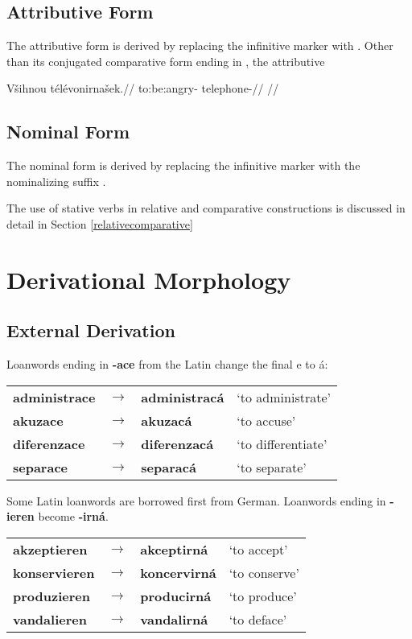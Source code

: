 \subsection{Attributive Form}
The attributive form is derived by replacing the infinitive marker  with . Other than its conjugated comparative form ending in , the attributive

\ex
\begingl
\gla V\v{s}ihnou t\'el\'evonirna\v{s}ek.//
\glb to:be:angry- telephone-//
\glft {}//
\endgl

\xe


\subsection{Nominal Form}
The nominal form is derived by replacing the infinitive marker  with the nominalizing suffix .




The use of stative verbs in relative and comparative constructions is discussed in detail in Section \ref{relativecomparative}
\section{Derivational Morphology}
\subsection{External Derivation}
\par Loanwords ending in \textbf{-ace} from the Latin change the final e to á:
\begin{table}[h!]
	\centering \small
	\begin{tabu} to 0.9
		administrace 	& $\rightarrow$ & administracá 	& `to administrate' \\
		akuzace			& $\rightarrow$ & akuzacá		& `to accuse'\\
		diferenzace		& $\rightarrow$ & diferenzacá	& `to differentiate'\\
		separace		& $\rightarrow$ & separacá		& `to separate'\\
	\end{tabu}
\end{table}
\par Some Latin loanwords are borrowed first from German. Loanwords ending in \textbf{-ieren} become \textbf{-irná}.
\begin{table}[h!]
	\centering \small
	\begin{tabu} to 0.9
		akzeptieren 	& $\rightarrow$ & akceptirná 	& `to accept' \\
		konservieren	& $\rightarrow$ & koncervirná	& `to conserve'\\
		produzieren		& $\rightarrow$ & producirná	& `to produce'\\
		vandalieren		& $\rightarrow$ & vandalirná 	& `to deface'\\
	\end{tabu}
\end{table}
